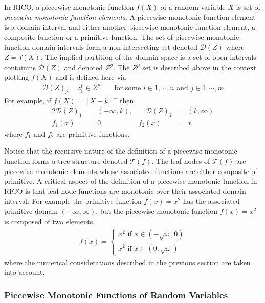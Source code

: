 In RICO, a piecewise monotonic function $f(X)$ of a random variable $X$ is set of \emph{piecewise monotonic function elements}. A piecewise monotonic function element is a domain interval and either another piecewise monotonic function element, a composite function or a primitive function. The set of piecewise monotonic function domain intervals form a non-intersecting set denoted $\mathcal{D}(Z)$ where $Z = f(X)$. The implied partition of the domain space is a set of open intervals containins $\mathcal{D}(Z)$ and denoted $Z^p$. The $Z^p$ set is described above in the context plotting $f(X)$ and is defined here via
\begin{align*}
\mathcal{D}(Z)_j = z_i^p \in Z^p && \text { for some } i \in 1, \cdots, n \text{ and } j \in 1, \cdots, m
\end{align*}
For example, if $f(X) = [X-k]^+$ then
\begin{alignat*}{2}
\mathcal{D}(Z)_1 &= (-\infty, k), &\quad \mathcal{D}(Z)_2 &= (k, \infty)\\
f_1(x) &= 0,  &f_2(x) &= x
\end{alignat*}
where $f_1$ and $f_2$ are primitive functions.

Notice that the recursive nature of the definition of a piecewise monotonic function forms a tree structure denoted $\mathcal{T}(f)$. The leaf nodes of $\mathcal{T}(f)$ are piecewise monotonic elements whose associated functions are either composite of primitive. A critical aspect of the definition of a piecewise monotonic function in RICO is that leaf node functions are monotonic over their associated domain interval. For example the primitive function $f(x) = x^2$ has the associated primitive domain $(-\infty, \infty)$, but the piecewise monotonic function $f(x) = x^2$ is composed of two elements,
\begin{align}
f(x) = \begin{cases}x^2 \text{ if } x \in (-\sqrt{\omega}, 0)\\
                    x^2 \text{ if } x \in (0, \sqrt{\omega})
       \end{cases}
\label{equation:x2}
\end{align}
where the numerical considerations described in the previous section are taken into account.

\subsubsection{Piecewise Monotonic Functions of Random Variables}

